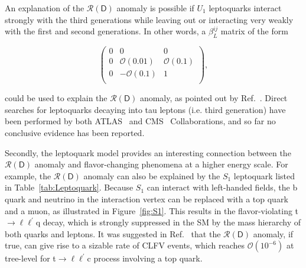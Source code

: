 An explanation of the $\mathcal{R}(\textsf{D})$ anomaly is possible if $U_{1}$ leptoquarks interact strongly with the third generations while leaving out or interacting very weakly with the first and second generations. In other words, a $\beta^{ij}_{L}$ matrix of the form

\begin{equation}
\begin{pmatrix}
0 & 0 & 0\\
0 & \mathcal{O}(0.01) & \mathcal{O}(0.1)\\
0 & -\mathcal{O}(0.1) & 1\\
\end{pmatrix},
\end{equation}

could be used to explain the $\mathcal{R}(\textsf{D})$ anomaly, as pointed out by Ref.~\cite{Cornella:2021sby}. Direct searches for leptoquarks decaying into tau leptons (i.e. third generation) have been performed by both \ac{ATLAS}~\cite{ATLAS:2023uox,ATLAS:2023vxj} and \ac{CMS}~\cite{CMS:2018txo,CMS:2023qdw} Collaborations, and so far no conclusive evidence has been reported.

Secondly, the leptoquark model provides an interesting connection between the $\mathcal{R}(\textsf{D})$ anomaly and flavor-changing phenomena at a higher energy scale. For example, the $\mathcal{R}(\textsf{D})$ anomaly can also be explained by the $S_1$ leptoquark listed in Table~\ref{tab:Leptoquark}. Because $S_1$ can interact with left-handed fields, the b quark and neutrino in the interaction vertex can be replaced with a top quark and a muon, as illustrated in Figure~\ref{fig:S1}. This results in the flavor-violating t$\rightarrow\ell\ell^{\prime}$q decay, which is strongly suppressed in the \ac{SM} by the mass hierarchy of both quarks and leptons. It was suggested in Ref.~\cite{Kim:2018oih} that the $\mathcal{R}(\textsf{D})$ anomaly, if true, can give rise to a sizable rate of \ac{CLFV} events, which reaches $\mathcal{O}(10^{-6})$ at tree-level for t$\rightarrow\ell\ell^{\prime}$c process involving a top quark.

